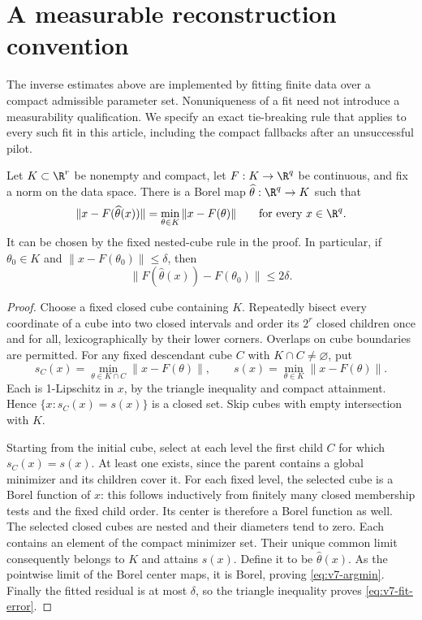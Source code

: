 \section{A measurable reconstruction convention}
\label{sec:v7-measurable}
The inverse estimates above are implemented by fitting finite data over a compact admissible parameter set. Nonuniqueness of a fit need not introduce a measurability qualification. We specify an exact tie-breaking rule that applies to every such fit in this article, including the compact fallbacks after an unsuccessful pilot.

\begin{proposition}
\label{prop:v7-measurable}
Let $K\subset\R^r$ be nonempty and compact, let $F:K\to\R^q$ be continuous, and fix a norm on the data space. There is a Borel map $\widehat\theta:\R^q\to K$ such that
\begin{equation}\label{eq:v7-argmin}
 \|x-F(\widehat\theta(x))\|=\min_{\theta\in K}\|x-F(\theta)\|
 \qquad\text{for every }x\in\R^q.
\end{equation}
It can be chosen by the fixed nested-cube rule in the proof. In particular, if $\theta_0\in K$ and $\|x-F(\theta_0)\|\le\delta$, then
\begin{equation}\label{eq:v7-fit-error}
             \|F(\widehat\theta(x))-F(\theta_0)\|\le2\delta.
\end{equation}
\end{proposition}
\begin{proof}
Choose a fixed closed cube containing $K$. Repeatedly bisect every coordinate of a cube into two closed intervals and order its $2^r$ closed children once and for all, lexicographically by their lower corners. Overlaps on cube boundaries are permitted. For any fixed descendant cube $C$ with $K\cap C\ne\varnothing$, put
\[
 s_C(x)=\min_{\theta\in K\cap C}\|x-F(\theta)\|,
 \qquad s(x)=\min_{\theta\in K}\|x-F(\theta)\|.
\]
Each is 1-Lipschitz in $x$, by the triangle inequality and compact attainment. Hence $\{x:s_C(x)=s(x)\}$ is a closed set. Skip cubes with empty intersection with $K$.

Starting from the initial cube, select at each level the first child $C$ for which $s_C(x)=s(x)$. At least one exists, since the parent contains a global minimizer and its children cover it. For each fixed level, the selected cube is a Borel function of $x$: this follows inductively from finitely many closed membership tests and the fixed child order. Its center is therefore a Borel function as well. The selected closed cubes are nested and their diameters tend to zero. Each contains an element of the compact minimizer set. Their unique common limit consequently belongs to $K$ and attains $s(x)$. Define it to be $\widehat\theta(x)$. As the pointwise limit of the Borel center maps, it is Borel, proving \eqref{eq:v7-argmin}. Finally the fitted residual is at most $\delta$, so the triangle inequality proves \eqref{eq:v7-fit-error}.
\end{proof}

